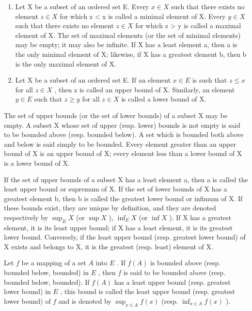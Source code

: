 \begin{enumerate}
\def\labelenumi{\arabic{enumi}.}
\setcounter{enumi}{5}
\item
  Let X be a subset of an ordered set E. Every \(x \in X\) such that there exists no element \(z \in X\) for which z \textless{} x is called a minimal element of X. Every \(y \in X\) such that there exists no element \(z \in X\) for which z \textgreater{} y is called a maximal element of X. The set of maximal elements (or the set of minimal elements) may be empty; it may also be infinite. If X has a least element a, then a is the only minimal element of X; likewise, if X has a greatest element b, then b is the only maximal element of X.
\item
  Let X be a subset of an ordered set E. If an element \(x \in E\) is such that \(z \leqslant x\) for all \(z \in X\) , then z is called an upper bound of X. Similarly, an element \(y \in E\) such that \(z \geqslant y\) for all \(z \in X\) is called a lower bound of X.
\end{enumerate}

The set of upper bounds (or the set of lower bounds) of a subset X may be empty. A subset X whose set of upper (resp. lower) bounds is not empty is said to be bounded above (resp. bounded below). A set which is bounded both above and below is said simply to be bounded. Every element greater than an upper bound of X is an upper bound of X; every element less than a lower bound of X is a lower bound of X.

If the set of upper bounds of a subset X has a least element a, then a is called the least upper bound or supremum of X. If the set of lower bounds of X has a greatest element b, then b is called the greatest lower bound or infimum of X. If these bounds exist, they are unique by definition, and they are denoted respectively by \(\sup_{E} X\) (or \(\sup X\) ), \(\inf_{E} X\) (or \(\inf X\) ). If X has a greatest element, it is its least upper bound; if X has a least element, it is its greatest lower bound. Conversely, if the least upper bound (resp. greatest lower bound) of X exists and belongs to X, it is the greatest (resp. least) element of X.

Let \(f\) be a mapping of a set \(A\) into \(E\) . If \(f(A)\) is bounded above (resp. bounded below, bounded) in \(E\) , then \(f\) is said to be bounded above (resp. bounded below, bounded). If \(f(A)\) has a least upper bound (resp. greatest lower bound) in \(E\) , this bound is called the least upper bound (resp. greatest lower bound) of \(f\) and is denoted by \(\sup_{x \in A} f(x)\) (resp. \(\inf_{x \in A} f(x)\) ).

